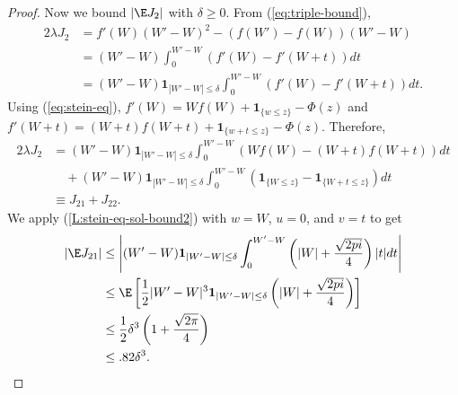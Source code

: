 \begin{proof}
  Now we bound $|\E J_2|$ with $\delta \geq 0$.  From (\ref{eq:triple-bound}),
  \begin{align*}
    2 \lambda J_2 &= f'(W)(W'-W)^2-(f(W')-f(W))(W'-W) \\
    &= (W'-W) \int_0^{W'-W}(f'(W) - f'(W+t)) dt \\
    &= (W'-W) \mathbf{1}_{|W'-W| \leq \delta} \int_0^{W'-W}(f'(W)-f'(W+t)) dt.
  \end{align*}
  Using (\ref{eq:stein-eq}), $f'(W) = Wf(W) + \mathbf{1}_{\{w \leq z\}} - \Phi(z)$ and
  $f'(W + t) = (W + t)f(W + t) + \mathbf{1}_{\{w + t \leq z\}} - \Phi(z)$. Therefore,
  \begin{align*}
    2 \lambda J_2 &= (W'-W) \mathbf{1}_{|W'-W| \leq \delta} \int_0^{W'-W}(Wf(W)-(W+t)f(W+t)) dt \\
    &\quad + (W'-W) \mathbf{1}_{|W'-W| \leq \delta} \int_0^{W'-W}(\mathbf{1}_{\{W \leq z\}} - \mathbf{1}_{\{W + t \leq z\}}) dt \\
    &\equiv J_{21} + J_{22}.
  \end{align*}
  We apply (\ref{L:stein-eq-sol-bound2}) with $w = W$, $u = 0$, and $v = t$ to get
  \begin{align*}
    |\E J_{21}| &\leq \left |
    (W'-W) \mathbf{1}_{|W'-W| \leq \delta} \int_0^{W'-W} \left( |W| + \frac{\sqrt{2 pi}}{4} \right ) |t| dt
    \right | \\
    &\leq \E \left [
      \frac{1}{2} |W' - W|^3 \mathbf{1}_{|W'-W| \leq \delta} \left( |W| + \frac{\sqrt{2 pi}}{4} \right )
    \right ] \\
    &\leq \frac{1}{2} \delta^3 \left ( 1 + \frac{\sqrt{2 \pi}}{4} \right ) \\
    &\leq .82 \delta^3.
  \end{align*}


\end{proof}
